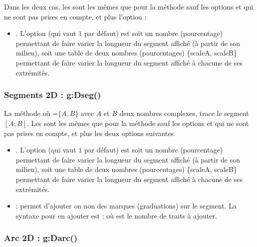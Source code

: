Dans les deux cas, les  sont les mêmes que pour la méthode  sauf les options  et  qui ne sont pas prises en compte, et plus l'option :
\begin{itemize}
    \item {}.  L'option  (qui vaut $1$ par défaut) est soit un nombre (pourcentage) permettant de faire varier la longueur du segment affiché (à partir de son milieu), soit une table de deux nombres (pourcentages) \{scaleA, scaleB\} permettant de faire varier la longueur du segment affiché à chacune de ses extrémités.
\end{itemize}

\subsubsection{Segments 2D : g:Dseg()}

La méthode  où =$\{A,B\}$ avec $A$ et $B$ deux nombres complexes, trace le segment $[A;B]$. Les  sont les mêmes que pour la méthode  sauf les options  et  qui ne sont pas prises en compte, et plus les deux options suivantes
\begin{itemize}
    \item {}. L'option  (qui vaut $1$ par défaut) est soit un nombre (pourcentage) permettant de faire varier la longueur du segment affiché (à partir de son milieu), soit une table de deux nombres (pourcentages) \{scaleA, scaleB\} permettant de faire varier la longueur du segment affiché à chacune de ses extrémités.
    
    \item {} : permet d'ajouter on non des marques (graduations) sur le segment. La syntaxe pour en ajouter est :  où  est le nombre de traits à ajouter.
\end{itemize}

\subsubsection{Arc 2D : g:Darc()}

